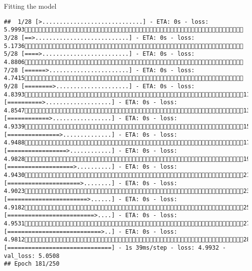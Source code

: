 \documentclass[
  ignorenonframetext,
]{beamer}
\begin{document}
\begin{frame}[fragile]{Fitting the model}
\begin{verbatim}
##  1/28 [>.............................] - ETA: 0s - loss: 5.9993 3/28 [==>...........................] - ETA: 0s - loss: 5.1736 5/28 [====>.........................] - ETA: 0s - loss: 4.8806 7/28 [======>.......................] - ETA: 0s - loss: 4.7415 9/28 [========>.....................] - ETA: 0s - loss: 4.839311/28 [==========>...................] - ETA: 0s - loss: 4.854713/28 [============>.................] - ETA: 0s - loss: 4.933915/28 [===============>..............] - ETA: 0s - loss: 4.948817/28 [=================>............] - ETA: 0s - loss: 4.982819/28 [===================>..........] - ETA: 0s - loss: 4.943021/28 [=====================>........] - ETA: 0s - loss: 4.902323/28 [=======================>......] - ETA: 0s - loss: 4.918225/28 [=========================>....] - ETA: 0s - loss: 4.953127/28 [===========================>..] - ETA: 0s - loss: 4.981228/28 [==============================] - 1s 39ms/step - loss: 4.9932 - val_loss: 5.0508
## Epoch 181/250

\end{verbatim}
\end{frame}
\end{document}
